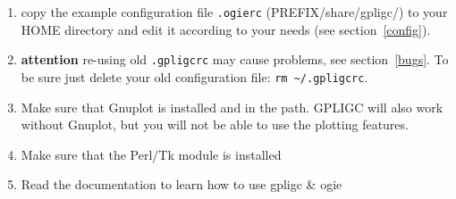 \begin{enumerate}

\item copy the example configuration file
\texttt{.ogierc} (PREFIX/share/gpligc/) to your HOME directory
and edit it according to your needs (see section~\ref{config}).

\item \textbf{attention} re-using old \texttt{.gpligcrc} may cause problems, see section~\ref{bugs}. To be sure just delete your old configuration
file: \texttt{rm \textasciitilde/.gpligcrc}.

\item Make sure that Gnuplot \cite{gnuplot} is installed and in the path.
GPLIGC will also work without Gnuplot,  but you will not be able to use the plotting features.

\item Make sure that the Perl/Tk \cite{perltk} module is installed

\item Read the documentation to learn how to use gpligc \& ogie

\end{enumerate}





